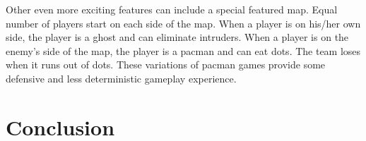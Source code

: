 \documentclass{acm_proc_article-sp}
\begin{document}
Other even more exciting features can include a special featured
map. Equal number of players start on each side of the map. When a
player is on his/her own side, the player is a ghost and can eliminate
intruders. When a player is on the enemy's side of the map, the player
is a pacman and can eat dots. The team loses when it runs out of
dots. These variations of pacman games provide some defensive and less
deterministic gameplay experience.


\section{Conclusion}



\end{document}

